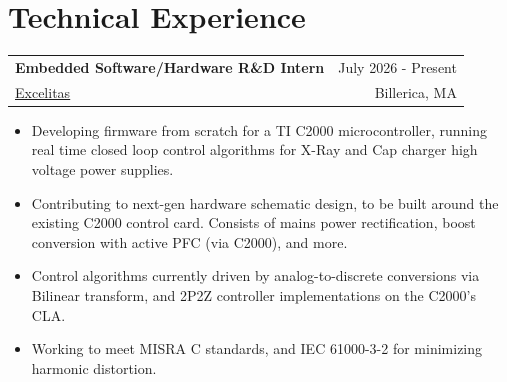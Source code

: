 \documentclass{article}
\begin{document}

\section{Technical Experience} \vspace{4pt}
    \raggedright\begin{tabular}{lr}
		\parbox[l]{3.65in}{\bf{\large{Embedded Software/Hardware R\&D Intern}}} &
        \parbox[r]{3.65in}{\raggedleft July 2026 - Present} \\
        \parbox[l]{3.65in}{\href{https://www.excelitas.com}{\underline{Excelitas}}} &
        \parbox[r]{3.65in}{\raggedleft Billerica, MA}
    \end{tabular}
    \vspace{-10pt}\begin{itemize} 
        \setlength{\itemsep}{-2pt}
		\item Developing firmware from scratch for a TI C2000 microcontroller, running real time closed loop control algorithms for X-Ray and Cap charger high voltage power supplies.
		\item Contributing to next-gen hardware schematic design, to be built around the existing C2000 control card. Consists of mains power rectification, boost conversion with active PFC (via C2000), and more.
		\item Control algorithms currently driven by analog-to-discrete conversions via Bilinear transform, and 2P2Z controller implementations on the C2000's CLA.
		\item Working to meet MISRA C standards, and IEC 61000-3-2 for minimizing harmonic distortion.
    \end{itemize}
\end{document}
